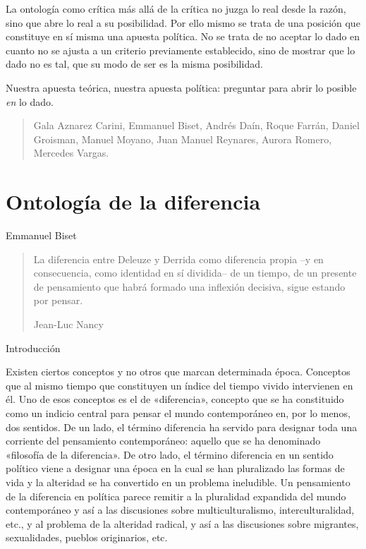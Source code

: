 La ontología como crítica más allá de la crítica no juzga lo real desde la razón, sino que abre lo real a su posibilidad. Por ello mismo se trata de una posición que constituye en sí misma una apuesta política. No se trata de no aceptar lo dado en cuanto no se ajusta a un criterio previamente establecido, sino de mostrar que lo dado no es tal, que su modo de ser es la misma posibilidad.

Nuestra apuesta teórica, nuestra apuesta política: preguntar para abrir lo posible \emph{en} lo dado.

\begin{quote}
Gala Aznarez Carini, Emmanuel Biset, Andrés Daín, Roque Farrán, Daniel Groisman, Manuel Moyano, Juan Manuel Reynares, Aurora Romero, Mercedes Vargas.
\end{quote}

\chapter{Ontología de la diferencia}

Emmanuel Biset

\begin{quote}
La diferencia entre Deleuze y Derrida como diferencia propia --y en consecuencia, como identidad en sí dividida-- de un tiempo, de un presente de pensamiento que habrá formado una inflexión decisiva, sigue estando por pensar.

Jean-Luc Nancy
\end{quote}



{Introducción}


Existen ciertos conceptos y no otros que marcan determinada época. Conceptos que al mismo tiempo que constituyen un índice del tiempo vivido intervienen en él. Uno de esos conceptos es el de «diferencia», concepto que se ha constituido como un indicio central para pensar el mundo contemporáneo en, por lo menos, dos sentidos. De un lado, el término diferencia ha servido para designar toda una corriente del pensamiento contemporáneo: aquello que se ha denominado «filosofía de la diferencia». De otro lado, el término diferencia en un sentido político viene a designar una época en la cual se han pluralizado las formas de vida y la alteridad se ha convertido en un problema ineludible. Un pensamiento de la diferencia en política parece remitir a la pluralidad expandida del mundo contemporáneo y así a las discusiones sobre multiculturalismo, interculturalidad, etc., y al problema de la alteridad radical, y así a las discusiones sobre migrantes, sexualidades, pueblos originarios, etc.

